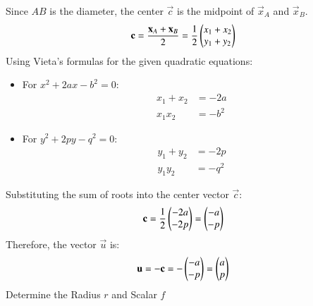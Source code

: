\documentclass[journal]{IEEEtran}
\theoremstyle{remark}
\begin{document}
Since $AB$ is the diameter, the center $\vec{c}$ is the midpoint of $\vec{x}_A$ and $\vec{x}_B$.
\begin{align*}
    \mathbf{c} = \frac{\mathbf{x}_A + \mathbf{x}_B}{2} = \frac{1}{2} \begin{pmatrix}x_1 + x_2 \\ y_1 + y_2\end{pmatrix}
\end{align*}
Using Vieta's formulas for the given quadratic equations:
\begin{itemize}
    \item For $x^2 + 2ax - b^2 = 0$:
        \begin{align*}
            x_1 + x_2 &= -2a \\
            x_1 x_2 &= -b^2
        \end{align*}
    \item For $y^2 + 2py - q^2 = 0$:
        \begin{align*}
            y_1 + y_2 &= -2p \\
            y_1 y_2 &= -q^2
        \end{align*}
\end{itemize}
Substituting the sum of roots into the center vector $\vec{c}$:
\begin{align*}
    \mathbf{c} = \frac{1}{2} \begin{pmatrix}-2a \\ -2p\end{pmatrix} = \begin{pmatrix}-a \\ -p\end{pmatrix}
\end{align*}
Therefore, the vector $\vec{u}$ is:
\begin{align*}
    \mathbf{u} = -\mathbf{c} = - \begin{pmatrix}-a \\ -p\end{pmatrix} = \begin{pmatrix}a \\ p\end{pmatrix}
\end{align*}
 Determine the Radius $r$ and Scalar $f$
\end{document}
